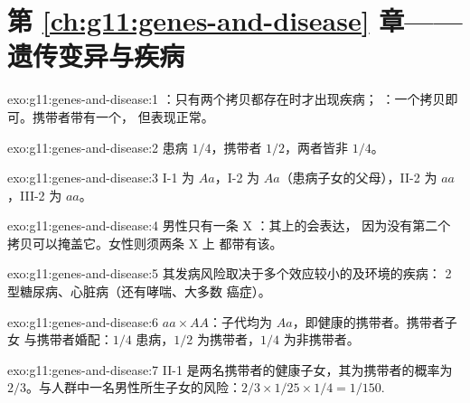 \section*{第 \ref{ch:g11:genes-and-disease} 章——遗传变异与疾病}

\begin{solution}{exo:g11:genes-and-disease:1}
：只有两个拷贝都存在时才出现疾病；
：一个拷贝即可。携带者带有一个，
但表现正常。
\end{solution}

\begin{solution}{exo:g11:genes-and-disease:2}
患病 $1/4$，携带者 $1/2$，两者皆非 $1/4$。
\end{solution}

\begin{solution}{exo:g11:genes-and-disease:3}
I-1 为 $Aa$，I-2 为 $Aa$（患病子女的父母），II-2 为 $aa$，III-2
为 $aa$。
\end{solution}

\begin{solution}{exo:g11:genes-and-disease:4}
男性只有一条 X ：其上的会表达，
因为没有第二个拷贝可以掩盖它。女性则须两条 X 上
都带有该。
\end{solution}

\begin{solution}{exo:g11:genes-and-disease:5}
其发病风险取决于多个效应较小的及环境的疾病：
2 型糖尿病、心脏病（还有哮喘、大多数
癌症）。
\end{solution}

\begin{solution}{exo:g11:genes-and-disease:6}
$aa \times AA$：子代均为 $Aa$，即健康的携带者。携带者子女
与携带者婚配：$1/4$ 患病，$1/2$ 为携带者，$1/4$ 为非携带者。
\end{solution}

\begin{solution}{exo:g11:genes-and-disease:7}
II-1 是两名携带者的健康子女，其为携带者的概率为
$2/3$。与人群中一名男性所生子女的风险：$2/3 \times 1/25 \times 1/4
= 1/150$.
\end{solution}

